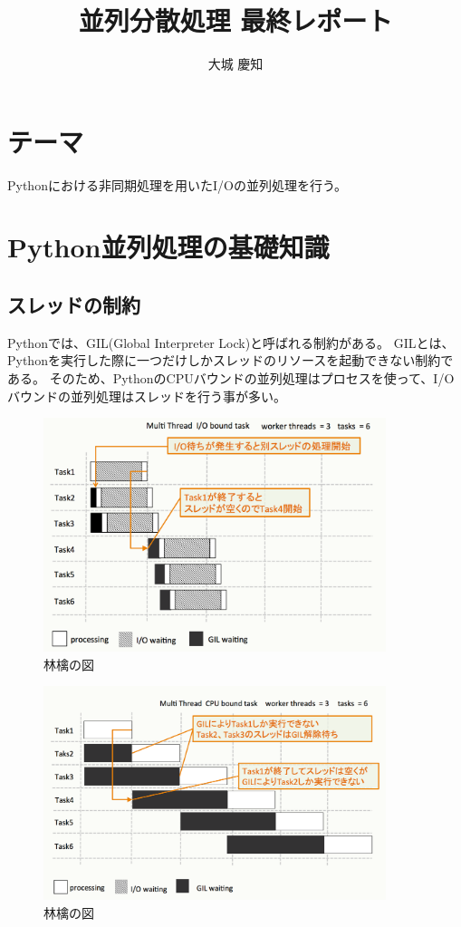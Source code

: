 \documentclass[14pt, oneside]{article}     	%
\title{並列分散処理  最終レポート}
\author{大城 慶知}
\begin{document}
\maketitle

\section{テーマ}
Pythonにおける非同期処理を用いたI/Oの並列処理を行う。
\section{Python並列処理の基礎知識}

\subsection{スレッドの制約}
Pythonでは、GIL(Global Interpreter Lock)と呼ばれる制約がある。
GILとは、Pythonを実行した際に一つだけしかスレッドのリソースを起動できない制約である。
そのため、PythonのCPUバウンドの並列処理はプロセスを使って、I/Oバウンドの並列処理はスレッドを行う事が多い。

\begin{figure}[h]
  \centering
  \includegraphics[width=10cm]{multithred_iobound.png}
  \caption{林檎の図}
\end{figure}

\begin{figure}[h]
  \centering
  \includegraphics[width=10cm]{multithred_cpubound.png}
  \caption{林檎の図}
\end{figure}
\end{document}
